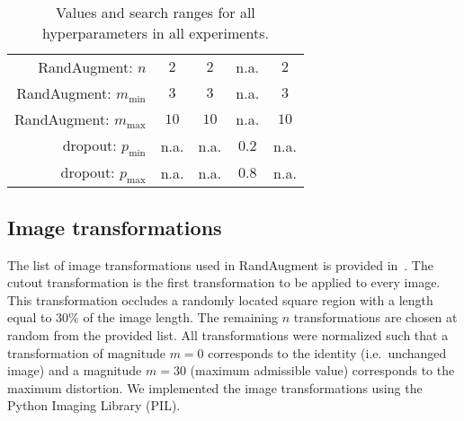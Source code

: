 \begin{table}
\begin{tabular}{r|cccc}
		RandAugment: $n$                    & $2$                   & $2$                   & n.a. & $2$                   \\ \hdashline[0.5pt/5pt]
		RandAugment: $m_{\text{min}}$       & $3$                   & $3$                   & n.a. &  $3$                 \\ \hdashline[0.5pt/5pt]
		RandAugment: $m_{\text{max}}$       & $10$                  & $10$                  & n.a.  &  $10$                \\ \hdashline[0.5pt/5pt]
		dropout: $p_{\text{min}}$           & n.a.                  & n.a.                  & $0.2$  & n.a.                 \\ \hdashline[0.5pt/5pt]
		dropout: $p_{\text{max}}$           & n.a.                  & n.a.                  & $0.8$  & n.a.
	\end{tabular}
	\caption{Values and search ranges for all hyperparameters in all experiments.}
	\label{tab:hyperparameters}
\end{table}


\subsection{Image transformations}
\label{sec:img_transf}
The list of image transformations used in RandAugment is provided in~. The cutout transformation is the first transformation to be applied to every image. This transformation occludes a randomly located square region with a length equal to $30\%$ of the image length. The remaining $n$ transformations are chosen at random from the provided list. All transformations were normalized such that a transformation of magnitude $m = 0$ corresponds to the identity (i.e.\ unchanged image) and a magnitude $m = 30$ (maximum admissible value) corresponds to the maximum distortion. We implemented the image transformations using the Python Imaging Library (PIL).

